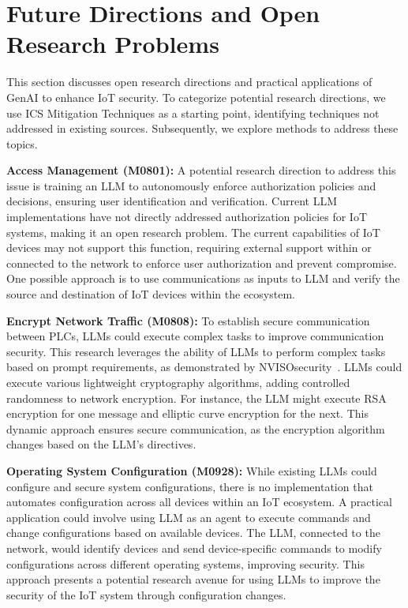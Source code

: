 \section{Future Directions and Open Research Problems}
\label{sec:future_works}
%
This section discusses open research directions and practical applications of GenAI to enhance IoT security.
To categorize potential research directions, we use ICS Mitigation Techniques as a starting point, identifying techniques not addressed in existing sources.
Subsequently, we explore methods to address these topics.

\smallskip
\noindent \textbf{Access Management (M0801): } A potential research direction to address this issue is training an LLM to autonomously enforce authorization policies and decisions, ensuring user identification and verification.
Current LLM implementations have not directly addressed authorization policies for IoT systems, making it an open research problem.
The current capabilities of IoT devices may not support this function, requiring external support within or connected to the network to enforce user authorization and prevent compromise.
One possible approach is to use communications as inputs to LLM and verify the source and destination of IoT devices within the ecosystem.

\smallskip
\noindent \textbf{Encrypt Network Traffic (M0808): } To establish secure communication between PLCs, LLMs could execute complex tasks to improve communication security.
This research leverages the ability of LLMs to perform complex tasks based on prompt requirements, as demonstrated by NVISOsecurity~\citet{Raman_2024}.
LLMs could execute various lightweight cryptography algorithms, adding controlled randomness to network encryption.
For instance, the LLM might execute RSA encryption for one message and elliptic curve encryption for the next.
This dynamic approach ensures secure communication, as the encryption algorithm changes based on the LLM's directives.

\smallskip
\noindent \textbf{Operating System Configuration (M0928): } While existing LLMs could configure and secure system configurations, there is no implementation that automates configuration across all devices within an IoT ecosystem.
A practical application could involve using LLM as an agent to execute commands and change configurations based on available devices.
The LLM, connected to the network, would identify devices and send device-specific commands to modify configurations across different operating systems, improving security.
This approach presents a potential research avenue for using LLMs to improve the security of the IoT system through configuration changes.

